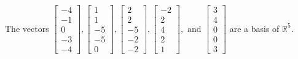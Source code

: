 \begin{exercise}
\begin{exerciseStatement}
  \end{exerciseStatement}
  \begin{exerciseAnswer}
   The vectors \(\left[\begin{array}{r}
-4 \\
-1 \\
0 \\
-3 \\
-4
\end{array}\right] , \left[\begin{array}{r}
1 \\
1 \\
-5 \\
-5 \\
0
\end{array}\right] , \left[\begin{array}{r}
2 \\
2 \\
-5 \\
-2 \\
-2
\end{array}\right] , \left[\begin{array}{r}
-2 \\
2 \\
4 \\
2 \\
1
\end{array}\right] , \text{ and } \left[\begin{array}{r}
3 \\
4 \\
0 \\
0 \\
3
\end{array}\right]\) 
  	 are  a basis of \(\mathbb{R}^5\).
  


  \end{exerciseAnswer}
\end{exercise}